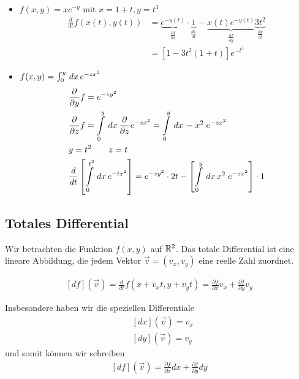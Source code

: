 \begin{Beispiel}
\begin{itemize}
  \item $f(x,y) = xe^{-y}$ mit $x = 1+t, y= t^3$\\
  \begin{align*}
\frac{d}{dt} f(x(t), y(t)) &=\underbrace{e^{-y(t)}}_{\frac{\partial
f}{\partial x}} \cdot\underbrace{1}_{\frac{dx}{dt}} -  \underbrace{
x(t)e^{-y(t)}}_{\frac{\partial f}{\partial y}} \underbrace{3t^2}_{\frac{dy}{dt}}\\ &= \left[1-3t^2(1+t)\right]e^{-t^3}
\end{align*}
\item $f(x,y) = \int_{0}^{y} \,dx\, e^{-zx^2}$
\begin{align*}
&\frac{\partial}{\partial y}f = e^{-zy^2}\\
&\frac{\partial}{\partial z}f = \int \limits_{0}^{y} \,dx\,
\frac{\partial}{\partial z} e^{-zx^2} = \int \limits_{0}^{y} \,dx\,
-x^2\;e^{-zx^2} \\
&y=t^2\qquad z=t\\
&\frac{d}{dt}\left[ \int \limits_{0}^{t^2} \,dx\, e^{-tx^2} \right] =
e^{-zy^2}\cdot2t - \left[\int \limits_{0}^{y} \,dx\,
x^2\;e^{-zx^2}\right]\cdot1
\end{align*}
\end{itemize}
\end{Beispiel}

\subsection{Totales Differential}
Wir betrachten die Funktion $f(x,y)$ auf $\mathbb{R}^2$. Das totale Differential ist eine lineare Abbildung, die jedem Vektor $\vec v = (v_x, v_y)$ eine reelle Zahl zuordnet.

\begin{align}
\left[df\right](\vec v) = \frac{d}{dt} f(x+v_xt, y+v_yt) = \frac{\partial f}{\partial x}v_x + \frac{\partial f}{\partial y} v_y
\end{align}

Insbesondere haben wir die speziellen Differentiale
\begin{align*}
&[dx](\vec v) = v_x\\
&[dy](\vec v) = v_y
\end{align*}
und somit können wir schreiben
\begin{align}
\left[df\right](\vec v) =  \frac{\partial f}{\partial x}dx + \frac{\partial f}{\partial y} dy
\end{align}

